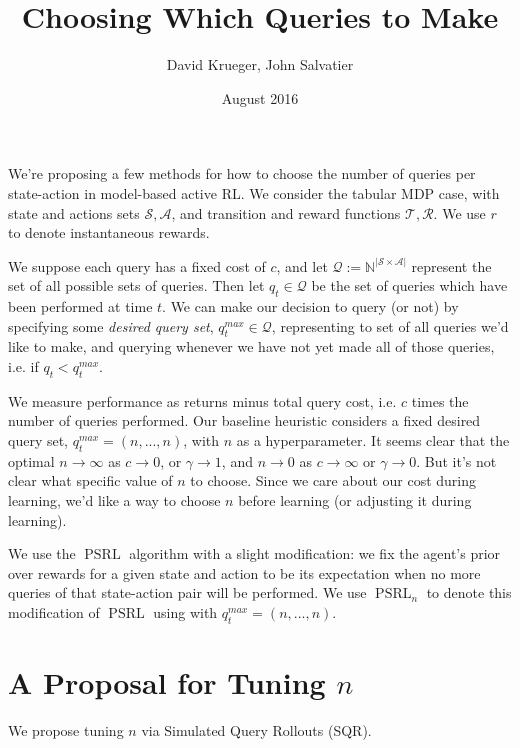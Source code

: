 \documentclass{article}
\title{Choosing Which Queries to Make}
\author{David Krueger, John Salvatier}
\date{August 2016}
\begin{document}
\maketitle




We're proposing a few methods for how to choose the number of queries per state-action in model-based active RL.
We consider the tabular MDP case, with state and actions sets $\mathcal{S}, \mathcal{A}$, and transition and reward functions $\mathcal{T}, \mathcal{R}$.
We use $r$ to denote instantaneous rewards.

We suppose each query has a fixed cost of $c$, and let $\mathcal{Q} := \mathbb{N}^{| \mathcal{S} \times \mathcal{A} |}$ represent the set of all possible sets of queries.
Then let $q_t \in \mathcal{Q}$ be the set of queries which have been performed at time $t$.
We can make our decision to query (or not) by specifying some \emph{desired query set}, $q^{max}_t \in \mathcal{Q}$, representing to set of all queries we'd like to make, and querying whenever we have not yet made all of those queries, i.e. if $q_t < q^{max}_t$.

We measure performance as returns minus total query cost, i.e. $c$ times the number of queries performed.
Our baseline heuristic considers a fixed desired query set, $q^{max}_t = (n,...,n)$, with $n$ as a hyperparameter.
It seems clear that the optimal $n \rightarrow \infty$ as $c \rightarrow 0$, or $\gamma \rightarrow 1$, and $n \rightarrow 0$ as $c \rightarrow \infty$ or $\gamma \rightarrow 0$.
But it's not clear what specific value of $n$ to choose.
Since we care about our cost during learning, we'd like a way to choose $n$ before learning (or adjusting it during learning).

We use the $\mathop{PSRL}$ algorithm with a slight modification: we fix the agent's prior over rewards for a given state and action to be its expectation when no more queries of that state-action pair will be performed.
We use $\mathop{PSRL}_n$ to denote this modification of $\mathop{PSRL}$ using with $q^{max}_t = (n,...,n)$.

\section{A Proposal for Tuning $n$}
We propose tuning $n$ via Simulated Query Rollouts (SQR). 
\end{document}
